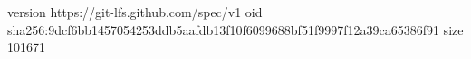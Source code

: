 version https://git-lfs.github.com/spec/v1
oid sha256:9dcf6bb1457054253ddb5aafdb13f10f6099688bf51f9997f12a39ca65386f91
size 101671
